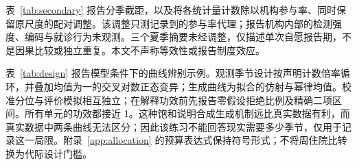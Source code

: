 表~\ref{tab:secondary} 报告分季截距，以及将各统计量计数除以机构参与率、同时保留原尺度的配对调整。该调整只测记录到的参与率代理；报告机构内部的检测强度、编码与就诊行为未观测。三个夏季摘要未经调整，仅描述单次自愿报告期，不是因果比较或独立重复。本文不声称等效性或报告制度效应。

表~\ref{tab:design} 报告模型条件下的曲线辨别示例。观测季节设计按声明计数倍率循环，并叠加均值为一的交叉对数正态变异；生成曲线为拟合的仿射与幂律均值。校准分位与评价模拟相互独立；在解释功效前先报告零假设拒绝比例及精确二项区间。所有单元的功效都接近 1。这种饱和说明合成生成机制远比真实数据有利，而真实数据中两条曲线无法区分；因此该练习不能回答现实需要多少季节，仅用于记录这一局限。附录~\ref{app:allocation} 的预算表达式保持符号形式；不将周住院比转换为代际设计门槛。









